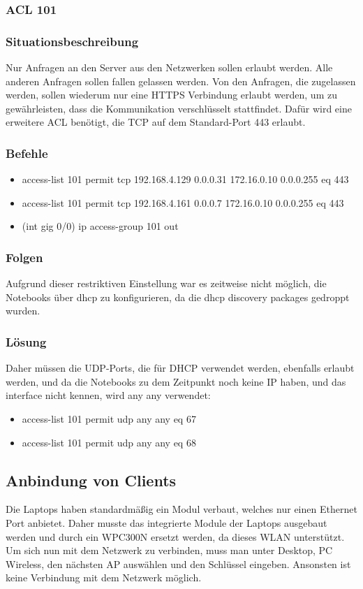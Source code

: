 \subsubsection{ACL 101}
\subsubsection{Situationsbeschreibung}
Nur Anfragen an den Server aus den Netzwerken sollen erlaubt werden. Alle anderen Anfragen sollen fallen gelassen werden. Von den Anfragen, die zugelassen werden, sollen wiederum nur eine HTTPS Verbindung erlaubt werden, um zu gewährleisten, dass die Kommunikation verschlüsselt stattfindet. Dafür wird eine erweitere ACL benötigt, die TCP auf dem Standard-Port 443 erlaubt.

\subsubsection{Befehle}
\begin{itemize}
	\item access-list 101 permit tcp 192.168.4.129 0.0.0.31 172.16.0.10 0.0.0.255 eq 443
	\item access-list 101 permit tcp 192.168.4.161 0.0.0.7 172.16.0.10 0.0.0.255 eq 443
	\item (int gig 0/0) ip access-group 101 out
\end{itemize}

\subsubsection{Folgen}
Aufgrund dieser restriktiven Einstellung war es zeitweise nicht möglich, die Notebooks über dhcp zu konfigurieren, da die dhcp discovery packages gedroppt wurden.

\subsubsection{Lösung}
Daher müssen die UDP-Ports, die für DHCP verwendet werden, ebenfalls erlaubt werden, und da die Notebooks zu dem Zeitpunkt noch keine IP haben, und das interface nicht kennen, wird any any verwendet:
\begin{itemize}
	\item access-list 101 permit udp any any eq 67
	\item access-list 101 permit udp any any eq 68
\end{itemize}

\subsection{Anbindung von Clients}
Die Laptops haben standardmäßig ein Modul verbaut, welches nur einen Ethernet Port anbietet. Daher musste das integrierte Module der Laptops ausgebaut werden und durch ein WPC300N ersetzt werden, da dieses WLAN unterstützt. Um sich nun mit dem Netzwerk zu verbinden, muss man unter Desktop, PC Wireless, den nächsten AP auswählen und den Schlüssel eingeben. Ansonsten ist keine Verbindung mit dem Netzwerk möglich.

